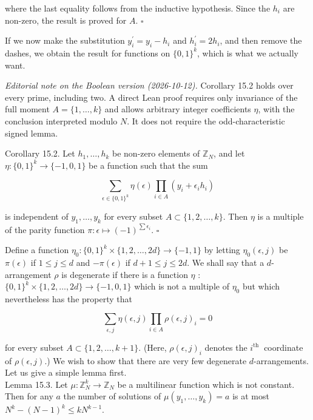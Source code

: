 \documentclass[10pt]{article}
\begin{document}
where the last equality follows from the inductive hypothesis. Since the $h_{i}$ are non-zero, the result is proved for $A$. \(\square\)

If we now make the substitution $y_{i}^{\prime}=y_{i}-h_{i}$ and $h_{i}^{\prime}=2 h_{i}$, and then remove the dashes, we obtain the result for functions on $\{0,1\}^{k}$, which is what we actually want.

\emph{Editorial note on the Boolean version (2026-10-12).}
Corollary 15.2 holds over every prime, including two. A direct Lean proof
requires only invariance of the full moment $A=\{1,\ldots,k\}$ and allows
arbitrary integer coefficients $\eta$, with the conclusion interpreted
modulo $N$. It does not require the odd-characteristic signed lemma.

Corollary 15.2. Let $h_{1}, \ldots, h_{k}$ be non-zero elements of $\mathbb{Z}_{N}$, and let $\eta:\{0,1\}^{k} \rightarrow\{-1,0,1\}$ be a function such that the sum

$$
\sum_{\epsilon \in\{0,1\}^{k}} \eta(\epsilon) \prod_{i \in A}\left(y_{i}+\epsilon_{i} h_{i}\right)
$$

is independent of $y_{1}, \ldots, y_{k}$ for every subset $A \subset\{1,2, \ldots, k\}$. Then $\eta$ is a multiple of the parity function $\pi: \epsilon \mapsto(-1)^{\sum \epsilon_{i}}$. \(\square\)

Define a function $\eta_{0}:\{0,1\}^{k} \times\{1,2, \ldots, 2 d\} \rightarrow\{-1,1\}$ by letting $\eta_{0}(\epsilon, j)$ be $\pi(\epsilon)$ if $1 \leqslant j \leqslant d$ and $-\pi(\epsilon)$ if $d+1 \leqslant j \leqslant 2 d$. We shall say that a $d$-arrangement $\rho$ is degenerate if there is a function $\eta$ : $\{0,1\}^{k} \times\{1,2, \ldots, 2 d\} \rightarrow\{-1,0,1\}$ which is not a multiple of $\eta_{0}$ but which nevertheless has the property that

$$
\sum_{\epsilon, j} \eta(\epsilon, j) \prod_{i \in A} \rho(\epsilon, j)_{i}=0
$$

for every subset $A \subset\{1,2, \ldots, k+1\}$. (Here, $\rho(\epsilon, j)_{i}$ denotes the $i^{\text {th }}$ coordinate of $\rho(\epsilon, j)$.) We wish to show that there are very few degenerate $d$-arrangements. Let us give a simple lemma first.\\
Lemma 15.3. Let $\mu: \mathbb{Z}_{N}^{k} \rightarrow \mathbb{Z}_{N}$ be a multilinear function which is not constant. Then for any $a$ the number of solutions of $\mu\left(y_{1}, \ldots, y_{k}\right)=a$ is at most $N^{k}-(N-1)^{k} \leqslant k N^{k-1}$.
\end{document}
